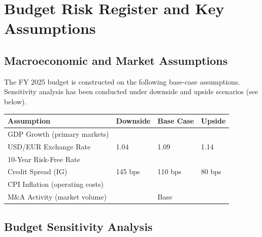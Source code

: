 
\section{Budget Risk Register and Key Assumptions}

\subsection{Macroeconomic and Market Assumptions}

The FY 2025 budget is constructed on the following base-case assumptions.
Sensitivity analysis has been conducted under downside and upside scenarios (see below).

\vspace{4pt}
\begin{center}
\renewcommand{\arraystretch}{1.35}
\begin{tabular}{L{4.5cm} C{2.5cm} C{2.5cm} C{2.5cm}}
  \toprule
  \color{white}\textbf{Assumption} &
  \color{white}\textbf{Downside} &
  \color{white}\textbf{Base Case} &
  \color{white}\textbf{Upside} \\
  \midrule
  GDP Growth (primary markets)     &   &   &   \\
  USD/EUR Exchange Rate            & 1.04        & 1.09        & 1.14        \\
  10-Year Risk-Free Rate           &   &   &   \\
  Credit Spread (IG)               & 145 bps     & 110 bps     & 80 bps      \\
  CPI Inflation (operating costs)  &   &   &   \\
  M\&A Activity (market volume)    &  & Base        &  \\
  \bottomrule
\end{tabular}
\end{center}

\vspace{8pt}

\subsection{Budget Sensitivity Analysis}

